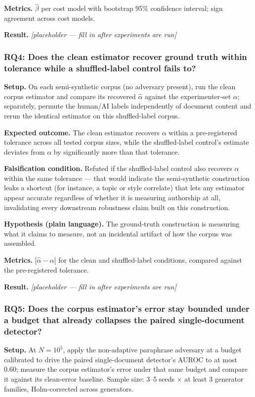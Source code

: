 \documentclass[11pt]{article}
\newcommand{\ph}{\textit{[placeholder --- fill in after experiments are run]}}
\begin{document}
\textbf{Metrics.} $\hat\beta$ per cost model with bootstrap 95\% confidence interval; sign agreement across cost models.

\textbf{Result.} \ph

\subsubsection{RQ4: Does the clean estimator recover ground truth within tolerance while a shuffled-label control fails to?}
\textbf{Setup.} On each semi-synthetic corpus (no adversary present), run the clean corpus estimator and compare its recovered $\hat\alpha$ against the experimenter-set $\alpha$; separately, permute the human/AI labels independently of document content and rerun the identical estimator on this shuffled-label corpus.

\textbf{Expected outcome.} The clean estimator recovers $\alpha$ within a pre-registered tolerance across all tested corpus sizes, while the shuffled-label control's estimate deviates from $\alpha$ by significantly more than that tolerance.

\textbf{Falsification condition.} Refuted if the shuffled-label control also recovers $\alpha$ within the same tolerance --- that would indicate the semi-synthetic construction leaks a shortcut (for instance, a topic or style correlate) that lets any estimator appear accurate regardless of whether it is measuring authorship at all, invalidating every downstream robustness claim built on this construction.

\textbf{Hypothesis (plain language).} The ground-truth construction is measuring what it claims to measure, not an incidental artifact of how the corpus was assembled.

\textbf{Metrics.} $|\hat\alpha - \alpha|$ for the clean and shuffled-label conditions, compared against the pre-registered tolerance.

\textbf{Result.} \ph

\subsubsection{RQ5: Does the corpus estimator's error stay bounded under a budget that already collapses the paired single-document detector?}
\textbf{Setup.} At $N = 10^5$, apply the non-adaptive paraphrase adversary at a budget calibrated to drive the paired single-document detector's AUROC to at most 0.60; measure the corpus estimator's error under that same budget and compare it against its clean-error baseline. Sample size: 3--5 seeds $\times$ at least 3 generator families, Holm-corrected across generators.
\end{document}
